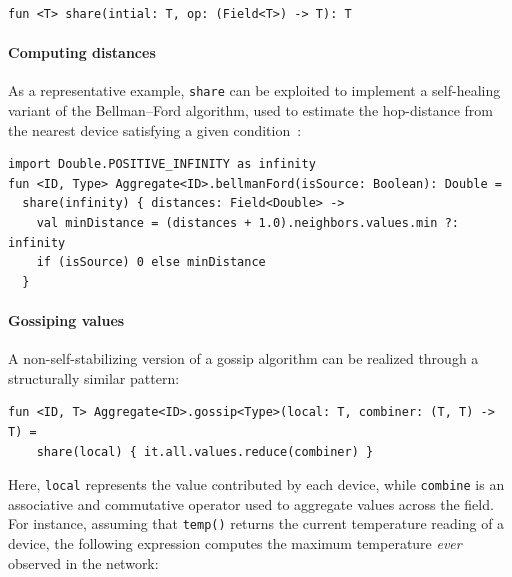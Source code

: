 \documentclass[runningheads]{llncs}
\begin{document}
\vspace{5pt}
\begin{minipage}{.95\columnwidth}
    \begin{lstlisting}
fun <T> share(intial: T, op: (Field<T>) -> T): T
    \end{lstlisting}
\end{minipage}

\paragraph{Computing distances}
As a representative example,
\lstinline|share| can be exploited to implement a self-healing variant of the Bellman--Ford algorithm,
used to estimate the hop-distance from the nearest device satisfying a given condition~\cite{DBLP:journals/tomacs/ViroliABDP18}:

\vspace{5pt}
\begin{minipage}{.95\columnwidth}
    \begin{lstlisting}
import Double.POSITIVE_INFINITY as infinity
fun <ID, Type> Aggregate<ID>.bellmanFord(isSource: Boolean): Double =
  share(infinity) { distances: Field<Double> ->
    val minDistance = (distances + 1.0).neighbors.values.min ?: infinity
    if (isSource) 0 else minDistance
  }
    \end{lstlisting}
\end{minipage}

\paragraph{Gossiping values}

A non-self-stabilizing version of a gossip algorithm can be realized through a structurally similar pattern:

\vspace{5pt}
\begin{minipage}{.95\columnwidth}
    \begin{lstlisting}
fun <ID, T> Aggregate<ID>.gossip<Type>(local: T, combiner: (T, T) -> T) =
    share(local) { it.all.values.reduce(combiner) }
    \end{lstlisting}
\end{minipage}

Here, \texttt{local} represents the value contributed by each device,
while \texttt{combine} is an associative and commutative operator used to aggregate values across the field.
%
For instance,
assuming that \lstinline|temp()| returns the current temperature reading of a device,
the following expression computes the maximum temperature \emph{ever} observed in the network:
\end{document}
